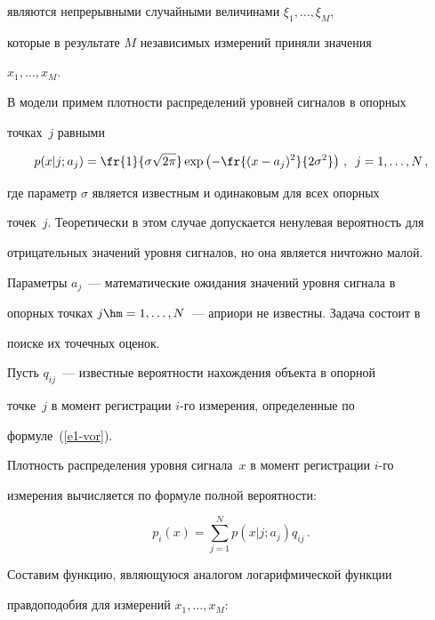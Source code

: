 являются непрерывными случайными величинами $\xi_1, \ldots , \xi_M$,

которые в результате $M$ независимых измерений приняли значения

$x_1,\ldots , x_M$.



 В модели примем плотности распределений уровней сигналов в опорных

точках~$j$ равными



\noindent

 \begin{equation}

 p(x\vert j; a_j) =\fr{1}{\sigma\sqrt{2\pi}}\exp\left( - \fr{(x-

a_j)^2}{2\sigma^2}\right)\,, \enskip j=1,\ldots , N\,,

 \label{e2-vor}

 \end{equation}

где параметр $\sigma$ является известным и одинаковым для всех опорных

точек~$j$. Теоретически в этом случае допускается ненулевая вероятность для

отрицательных значений уровня сигналов, но она является ничтожно малой.

Параметры $a_j$~--- математические ожидания значений уровня сигнала в

опорных точках $j\hm= 1,\ldots , N$~--- априори не известны. Задача состоит в

поиске их точечных оценок.



 Пусть $q_{ij}$~--- известные вероятности нахождения объекта в опорной

точке~$j$ в момент регистрации $i$-го измерения, определенные по

формуле~(\ref{e1-vor}).



 Плотность распределения уровня сигнала~$x$ в момент регистрации $i$-го

измерения вычисляется по формуле полной вероятности:

 $$

 p_i(x) =\sum\limits_{j=1}^N p(x\vert j;a_j)q_{ij}\,.

 $$



 Составим функцию, являющуюся аналогом логарифмической функции

правдоподобия для измерений $x_1,\ldots , x_M$:

